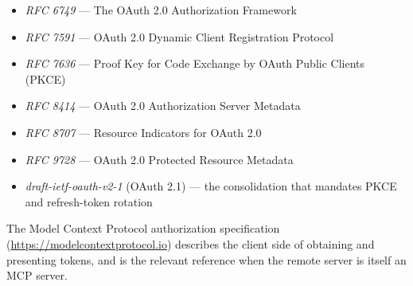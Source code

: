 \begin{itemize}
  \item \emph{RFC 6749} --- The OAuth 2.0 Authorization Framework
  \item \emph{RFC 7591} --- OAuth 2.0 Dynamic Client Registration Protocol
  \item \emph{RFC 7636} --- Proof Key for Code Exchange by OAuth Public Clients (PKCE)
  \item \emph{RFC 8414} --- OAuth 2.0 Authorization Server Metadata
  \item \emph{RFC 8707} --- Resource Indicators for OAuth 2.0
  \item \emph{RFC 9728} --- OAuth 2.0 Protected Resource Metadata
  \item \emph{draft-ietf-oauth-v2-1} (OAuth 2.1) --- the consolidation that mandates PKCE and refresh-token rotation
\end{itemize}

\noindent
The Model Context Protocol authorization specification (\url{https://modelcontextprotocol.io}) describes the client side of obtaining and presenting tokens, and is the relevant reference when the remote server is itself an MCP server.
